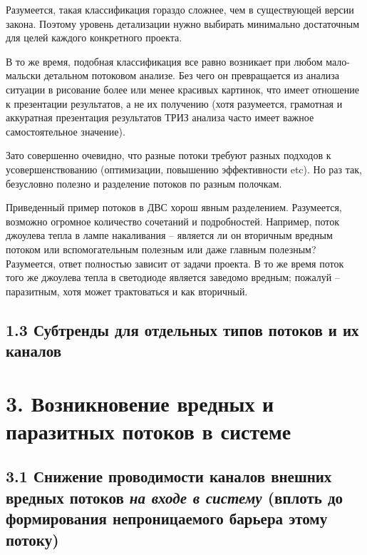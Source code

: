 \documentclass[a4paper,11pt]{article}
\begin{document}
Разумеется, такая классификация гораздо сложнее, чем в существующей версии
закона.  Поэтому уровень детализации нужно выбирать минимально достаточным для
целей каждого конкретного проекта.

В то же время, подобная классификация все равно возникает при любом
мало-мальски детальном потоковом анализе. Без чего он превращается из анализа
ситуации в рисование более или менее красивых картинок, что имеет отношение к
презентации результатов, а не их получению (хотя разумеется, грамотная и
аккуратная презентация результатов ТРИЗ анализа часто имеет важное
самостоятельное значение).

Зато совершенно очевидно, что разные потоки требуют разных подходов к
усовершенствованию (оптимизации, повышению эффективности etc). Но раз так,
безусловно полезно и разделение потоков по разным полочкам.

Приведенный пример потоков в ДВС хорош явным разделением. Разумеется, возможно
огромное количество сочетаний и подробностей. Например, поток джоулева тепла в
лампе накаливания -- является ли он вторичным вредным потоком или
вспомогательным полезным или даже главным полезным? Разумеется, ответ
полностью зависит от задачи проекта.  В то же время поток того же джоулева
тепла в светодиоде является заведомо вредным; пожалуй -- паразитным, хотя может
трактоваться и как вторичный.

\subsection{1.3 Субтренды для отдельных типов потоков и их каналов}

\section{3. Возникновение вредных и паразитных потоков в системе}

\subsection{3.1 Снижение проводимости каналов внешних вредных потоков \emph{на
    входе в систему} (вплоть до формирования непроницаемого барьера этому
  потоку)}
\end{document}
